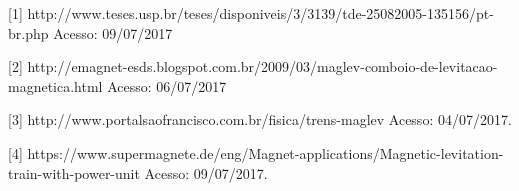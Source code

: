 \documentclass[
	12pt,				%
	openany,			%
	a4paper,			%
	english,			%
	spanish,			%
	brazil,				%
	]{abntex2}
\begin{document}



[1]
http://www.teses.usp.br/teses/disponiveis/3/3139/tde-25082005-135156/pt-br.php Acesso: 09/07/2017

[2]
http://emagnet-esds.blogspot.com.br/2009/03/maglev-comboio-de-levitacao-magnetica.html Acesso: 06/07/2017

[3]	http://www.portalsaofrancisco.com.br/fisica/trens-maglev Acesso: 04/07/2017.

[4]	https://www.supermagnete.de/eng/Magnet-applications/Magnetic-levitation-train-with-power-unit	Acesso: 09/07/2017.










\printindex
\end{document}
